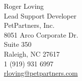 Roger Loving
\\ Lead Support Developer
\\ PetPartners, Inc.
\\ 8051 Arco Corporate Dr.
\\ Suite 350
\\ Raleigh, NC 27617
\\ 1 (919) 931 6997
\\ \href{mailto:rloving@petpartners.com}{rloving@petpartners.com}
